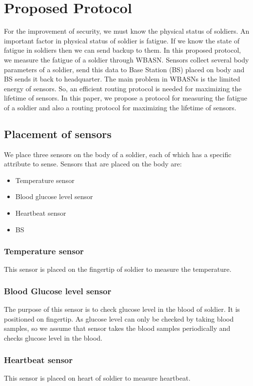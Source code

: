 \documentclass[journal]{IEEEtran}
\begin{document}
\section{Proposed Protocol}
 For the improvement of security, we must know the physical status of soldiers. An important factor in physical status of soldier is fatigue. If we know the state
  of fatigue in soldiers then we can send backup to them. In this proposed protocol, we measure the fatigue of a soldier through WBASN. Sensors collect several
  body parameters of a soldier, send this data to Base Station (BS) placed on body and BS sends it back to headquarter. The main problem in WBASNs is the limited
  energy of sensors. So, an efficient routing protocol is needed for maximizing the lifetime of sensors. In this paper, we propose a protocol for measuring the
  fatigue of a soldier and also a routing protocol for maximizing the lifetime of sensors.
\subsection{Placement of sensors}
We place three sensors on the body of a soldier, each of which has a specific attribute to sense. Sensors that are placed on the body are:

\begin{itemize}
\renewcommand{\labelitemi}{}
\item Temperature sensor
\item Blood glucose level sensor
\item Heartbeat sensor
\item BS
\end{itemize}


\subsubsection{Temperature sensor}
This sensor is placed on the fingertip of soldier to measure the temperature.
\subsubsection{Blood Glucose level sensor}
The purpose of this sensor is to check glucose level in the blood of soldier. It is positioned on fingertip. As glucose level can only be checked by taking
blood samples, so we assume that sensor takes the blood samples periodically and checks glucose level in the blood.
\subsubsection{Heartbeat sensor}
This sensor is placed on heart of soldier to measure heartbeat.
\end{document}
